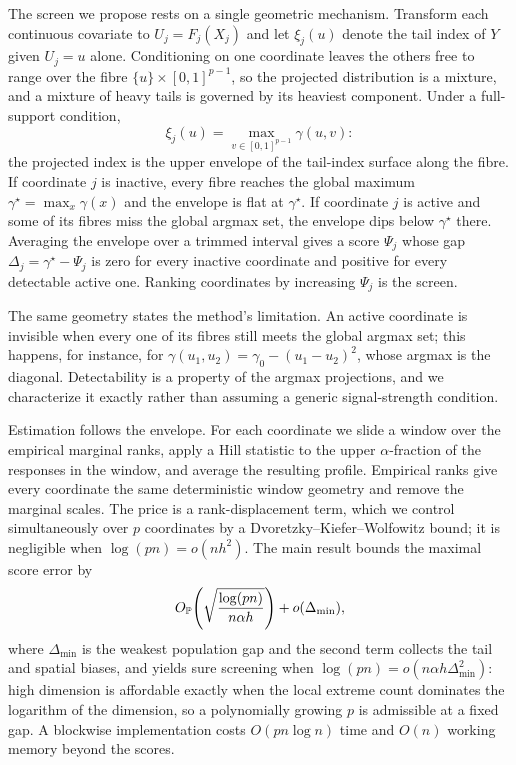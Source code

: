 \documentclass[bj,authoryear]{imsart}
\theoremstyle{plain}
\newcommand{\gmax}{\gamma^\star}
\begin{document}
The screen we propose rests on a single geometric mechanism. Transform each
continuous covariate to $U_j=F_j(X_j)$ and let $\xi_j(u)$ denote the tail
index of $Y$ given $U_j=u$ alone. Conditioning on one coordinate leaves the
others free to range over the fibre $\{u\}\times[0,1]^{p-1}$, so the
projected distribution is a mixture, and a mixture of heavy tails is governed
by its heaviest component. Under a full-support condition,
\begin{equation}\label{eq:intro-envelope}
 \xi_j(u)=\max_{v\in[0,1]^{p-1}}\gamma(u,v):
\end{equation}
the projected index is the upper envelope of the tail-index surface along the
fibre. If coordinate $j$ is inactive, every fibre reaches the global maximum
$\gmax=\max_x\gamma(x)$ and the envelope is flat at $\gmax$. If coordinate
$j$ is active and some of its fibres miss the global argmax set, the envelope
dips below $\gmax$ there. Averaging the envelope over a trimmed interval
gives a score $\Psi_j$ whose gap $\Delta_j=\gmax-\Psi_j$ is zero for every
inactive coordinate and positive for every detectable active one. Ranking
coordinates by increasing $\Psi_j$ is the screen.

The same geometry states the method's limitation. An active coordinate is
invisible when every one of its fibres still meets the global argmax set;
this happens, for instance, for $\gamma(u_1,u_2)=\gamma_0-(u_1-u_2)^2$,
whose argmax is the diagonal. Detectability is a property of the argmax
projections, and we characterize it exactly rather than assuming a generic
signal-strength condition.

Estimation follows the envelope. For each coordinate we slide a window over
the empirical marginal ranks, apply a Hill statistic to the upper
$\alpha$-fraction of the responses in the window, and average the resulting
profile. Empirical ranks give every coordinate the same deterministic window
geometry and remove the marginal scales. The price is a rank-displacement
term, which we control simultaneously over $p$ coordinates by a
Dvoretzky--Kiefer--Wolfowitz bound; it is negligible when $\log(pn)=o(nh^2)$.
The main result bounds the maximal score error by
\[
 O_{\mathbb P}\!\left(\sqrt{\frac{\log(pn)}{n\alpha h}}\right)+o(\Delta_{\min}),
\]
where $\Delta_{\min}$ is the weakest population gap and the second term
collects the tail and spatial biases, and yields sure screening when
$\log(pn)=o(n\alpha h\Delta_{\min}^2)$: high dimension is affordable
exactly when the local extreme count dominates the logarithm of the
dimension, so a polynomially growing $p$ is admissible at a fixed gap.
A blockwise implementation costs $O(pn\log n)$ time and $O(n)$ working
memory beyond the scores.
\end{document}
